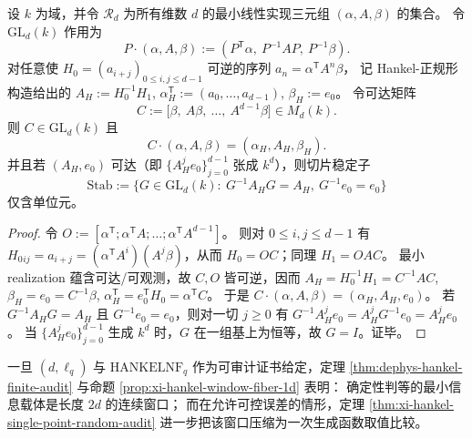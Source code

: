 \begin{proposition}\label{prop:xi-hankel-nf-gld-slice-stabilizer}
设 \(k\) 为域，并令 \(\mathcal{R}_d\) 为所有维数 \(d\) 的最小线性实现三元组 \((\alpha,A,\beta)\) 的集合。
令 \(\mathrm{GL}_d(k)\) 作用为
\[
P\cdot(\alpha,A,\beta):=(P^{\mathsf T}\alpha,\ P^{-1}AP,\ P^{-1}\beta).
\]
对任意使 \(H_0=(a_{i+j})_{0\le i,j\le d-1}\) 可逆的序列 \(a_n=\alpha^{\mathsf T}A^n\beta\)，
记 Hankel-正规形构造给出的
\(
A_H:=H_0^{-1}H_1
\),
\(
\alpha_H^{\mathsf T}:=(a_0,\dots,a_{d-1})
\),
\(
\beta_H:=e_0
\)。
令可达矩阵
\[
C:=\big[\beta,\ A\beta,\ \dots,\ A^{d-1}\beta\big]\in M_d(k).
\]
则 \(C\in\mathrm{GL}_d(k)\) 且
\[
C\cdot(\alpha,A,\beta)=(\alpha_H,A_H,\beta_H).
\]
并且若 \((A_H,e_0)\) 可达（即 \(\{A_H^j e_0\}_{j=0}^{d-1}\) 张成 \(k^d\)），则切片稳定子
\[
\mathrm{Stab}:=\{G\in \mathrm{GL}_d(k):\ G^{-1}A_HG=A_H,\ G^{-1}e_0=e_0\}
\]
仅含单位元。
\end{proposition}
\begin{proof}
令
\(
O:=[\alpha^{\mathsf T};\alpha^{\mathsf T}A;\dots;\alpha^{\mathsf T}A^{d-1}]
\)。
则对 \(0\le i,j\le d-1\) 有
\(
H_0{}_{ij}=a_{i+j}=(\alpha^{\mathsf T}A^i)(A^j\beta)
\)，从而 \(H_0=OC\)；同理 \(H_1=OAC\)。
最小 realization 蕴含可达/可观测，故 \(C,O\) 皆可逆，因而
\(
A_H=H_0^{-1}H_1=C^{-1}AC
\),
\(
\beta_H=e_0=C^{-1}\beta
\),
\(
\alpha_H^{\mathsf T}=e_0^{\mathsf T}H_0=\alpha^{\mathsf T}C
\)。
于是 \(C\cdot(\alpha,A,\beta)=(\alpha_H,A_H,e_0)\)。
若 \(G^{-1}A_HG=A_H\) 且 \(G^{-1}e_0=e_0\)，则对一切 \(j\ge 0\) 有
\(
G^{-1}A_H^je_0=A_H^jG^{-1}e_0=A_H^je_0
\)。
当 \(\{A_H^je_0\}_{j=0}^{d-1}\) 生成 \(k^d\) 时，\(G\) 在一组基上为恒等，故 \(G=I\)。证毕。
\end{proof}



\begin{remark}[窗口等价的语义压缩]\label{rem:xi-hankel-window-compile-equivalence}
一旦 \((d,\ell_q)\) 与 \(\mathrm{HANKELNF}_q\) 作为可审计证书给定，定理 \ref{thm:dephys-hankel-finite-audit} 与命题 \ref{prop:xi-hankel-window-fiber-1d} 表明：
确定性判等的最小信息载体是长度 \(2d\) 的连续窗口；
而在允许可控误差的情形，定理 \ref{thm:xi-hankel-single-point-random-audit} 进一步把该窗口压缩为一次生成函数取值比较。
\end{remark}

